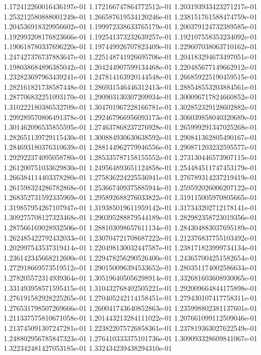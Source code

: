 1.172412260016436197e-01
1.172166747864772512e-01
1.203193933423271217e-01
1.253212580888001249e-01
1.266587619534120246e-01
1.238151761588474759e-01
1.204536918329956602e-01
1.199972338633765179e-01
1.200379124732389585e-01
1.192993208176823666e-01
1.192541373232639257e-01
1.192107558353234092e-01
1.190618780337696220e-01
1.197449926707823409e-01
1.229607038063710162e-01
1.247427376737883647e-01
1.225148741926695706e-01
1.204183294673497051e-01
1.198038684896385042e-01
1.204244907599134468e-01
1.220485677149662912e-01
1.232823697963439241e-01
1.247814163920144548e-01
1.266859225190459515e-01
1.282161821738587448e-01
1.286931546446312413e-01
1.288548553203884561e-01
1.287706832251093170e-01
1.290903130307209934e-01
1.300096717824660852e-01
1.310222180386532709e-01
1.304701967228166781e-01
1.302852329128602882e-01
1.299289570806491378e-01
1.292467966956093173e-01
1.306039858040320689e-01
1.301462096535855595e-01
1.274637868237276928e-01
1.265999291347025268e-01
1.282651139729115430e-01
1.300884930630638592e-01
1.290841362805490167e-01
1.284693180376310639e-01
1.288144962779946556e-01
1.290871203232595577e-01
1.292922374095058780e-01
1.285335787158155552e-01
1.273130446573907115e-01
1.261200751033629830e-01
1.249564893651124858e-01
1.254484511747453179e-01
1.266384114403378280e-01
1.275836224225536941e-01
1.276789314237219419e-01
1.261598324286782868e-01
1.253667409375885944e-01
1.259592026006207122e-01
1.268352731592335969e-01
1.295892688276033822e-01
1.319115005970805665e-01
1.319857954267107947e-01
1.319385019611959142e-01
1.317343202712178141e-01
1.309275708127323468e-01
1.290395288879544189e-01
1.282982358723019356e-01
1.287566169028932506e-01
1.288103098657611134e-01
1.284304883037695189e-01
1.262485422792432033e-01
1.230704721708687222e-01
1.212376837755103492e-01
1.202997543537319414e-01
1.220498130032447587e-01
1.238171823999734134e-01
1.236142345668212600e-01
1.229478256290526400e-01
1.243657004251582654e-01
1.272918669573519512e-01
1.290150096394533652e-01
1.280351174002586634e-01
1.278205572314939364e-01
1.305196405056298914e-01
1.332681603608930065e-01
1.331493958571595415e-01
1.310432768402505221e-01
1.292009664844175898e-01
1.276191582928225265e-01
1.270405242114158451e-01
1.279430107417758311e-01
1.276531798507269666e-01
1.260041743640852863e-01
1.235998802381137601e-01
1.211337575810671058e-01
1.201443213284111022e-01
1.207661099112509046e-01
1.213745091307247281e-01
1.223822075726858361e-01
1.237819363027622549e-01
1.248802956785847323e-01
1.276410333375101736e-01
1.309093328609841067e-01
1.322342481427053185e-01
1.332434239438294310e-01
